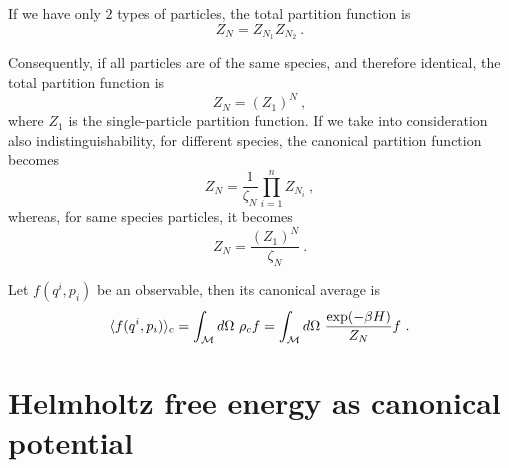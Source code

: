     \begin{example}
        If we have only $2$ types of particles, the total partition function is 
        \begin{equation*}
            Z_N = Z_{N_1} Z_{N_2} ~.
        \end{equation*}
    \end{example}
    Consequently, if all particles are of the same species, and therefore identical, the total partition function is 
    \begin{equation*}
        Z_N = (Z_1)^N ~,
    \end{equation*}
    where $Z_1$ is the single-particle partition function. 
    If we take into consideration also indistinguishability, for different species, the canonical partition function becomes 
    \begin{equation*}
        Z_N = \frac{1}{\zeta_N} \prod_{i=1}^{n} Z_{N_i} ~,
    \end{equation*}
    whereas, for same species particles, it becomes
    \begin{equation*}
        Z_N = \frac{(Z_1)^N}{\zeta_N} ~.
    \end{equation*}
    
    Let $f(q^i, p_i)$ be an observable, then its canonical average is 
    \begin{equation}\label{c:av}
        \langle f(q^i, p_i)\rangle_{c} = \int_{\mathcal M} d\Omega ~ \rho_{c} f = \int_{\mathcal M} d\Omega ~ \frac{\exp (-\beta H)}{Z_N} f ~.
    \end{equation}

\section{Helmholtz free energy as canonical potential}

